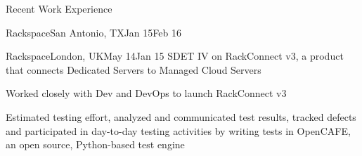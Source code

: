 \documentclass{resume} %
\begin{document}
\begin{rSection}{Recent Work Experience}
\begin{rSubsection}{Rackspace}{San Antonio, TX}{Jan 15}{Feb 16}
\end{rSubsection}


\begin{rSubsection}{Rackspace}{London, UK}{May 14}{Jan 15}
{SDET IV on RackConnect v3, a product that connects Dedicated Servers to Managed Cloud Servers}

\item Worked closely with Dev and DevOps to launch RackConnect v3
\item Estimated testing effort, analyzed and communicated test results, tracked defects and participated in day-to-day testing activities by writing tests in OpenCAFE, an open source, Python-based test engine
\end{rSubsection}
\end{rSection}

\end{document}
